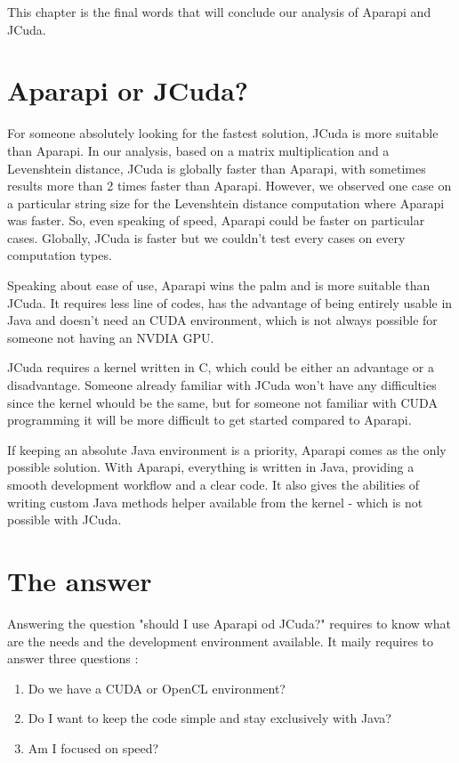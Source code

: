This chapter is the final words that will conclude our analysis of Aparapi and JCuda.

\section{Aparapi or JCuda?}

For someone absolutely looking for the fastest solution, JCuda is more suitable than Aparapi. In our analysis, based on a matrix multiplication and a Levenshtein distance, JCuda is globally faster than Aparapi, with sometimes results more than 2 times faster than Aparapi. However, we observed one case on a particular string size for the Levenshtein distance computation where Aparapi was faster. So, even speaking of speed, Aparapi could be faster on particular cases. Globally, JCuda is faster but we couldn't test every cases on every computation types.

Speaking about ease of use, Aparapi wins the palm and is more suitable than JCuda. It requires less line of codes, has the advantage of being entirely usable in Java and doesn't need an CUDA environment, which is not always possible for someone not having an NVDIA GPU.

JCuda requires a kernel written in C, which could be either an advantage or a disadvantage. Someone already familiar with JCuda won't have any difficulties since the kernel whould be the same, but for someone not familiar with CUDA programming it will be more difficult to get started compared to Aparapi.

If keeping an absolute Java environment is a priority, Aparapi comes as the only possible solution. With Aparapi, everything is written in Java, providing a smooth development workflow and a clear code. It also gives the abilities of writing custom Java methods helper available from the kernel - which is not possible with JCuda.

\section{The answer}

Answering the question "should I use Aparapi od JCuda?" requires to know what are the needs and the development environment available. It maily requires to answer three questions :

\begin{enumerate}
  \item Do we have a CUDA or OpenCL environment?
  \item Do I want to keep the code simple and stay exclusively with Java?
  \item Am I focused on speed?
\end{enumerate}

